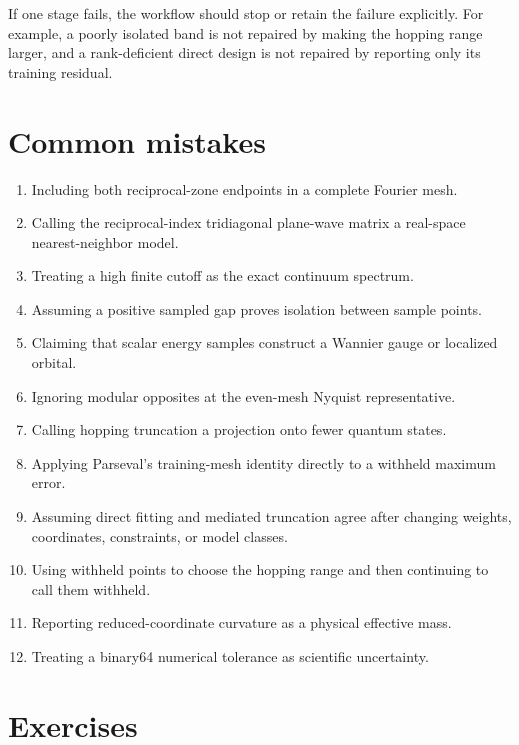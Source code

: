 If one stage fails, the workflow should stop or retain the failure explicitly.
For example, a poorly isolated band is not repaired by making the hopping range
larger, and a rank-deficient direct design is not repaired by reporting only its
training residual.

\section{Common mistakes}

\begin{enumerate}
  \item Including both reciprocal-zone endpoints in a complete Fourier mesh.
  \item Calling the reciprocal-index tridiagonal plane-wave matrix a
        real-space nearest-neighbor model.
  \item Treating a high finite cutoff as the exact continuum spectrum.
  \item Assuming a positive sampled gap proves isolation between sample points.
  \item Claiming that scalar energy samples construct a Wannier gauge or
        localized orbital.
  \item Ignoring modular opposites at the even-mesh Nyquist representative.
  \item Calling hopping truncation a projection onto fewer quantum states.
  \item Applying Parseval's training-mesh identity directly to a withheld
        maximum error.
  \item Assuming direct fitting and mediated truncation agree after changing
        weights, coordinates, constraints, or model classes.
  \item Using withheld points to choose the hopping range and then continuing
        to call them withheld.
  \item Reporting reduced-coordinate curvature as a physical effective mass.
  \item Treating a binary64 numerical tolerance as scientific uncertainty.
\end{enumerate}

\section{Exercises}

